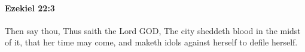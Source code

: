 
		\paragraph{Ezekiel 22:3} %
			\label{EZEKIEL-22-3}

			Then say thou, Thus saith the Lord GOD, The city sheddeth blood in the midst of it, that her time may come, and maketh idols against herself to defile herself.


